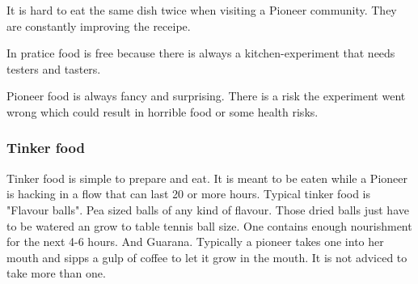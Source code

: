 It is hard to eat the same dish twice when visiting a Pioneer community. They are constantly improving the receipe.

In pratice food is free because there is always a kitchen-experiment that needs testers and tasters.

Pioneer food is always fancy and surprising. There is a risk the experiment went wrong which could result in horrible food or some health risks.

\subsubsection{Tinker food}

Tinker food is simple to prepare and eat. It is meant to be eaten while a Pioneer is hacking in a flow that can last 20 or more hours. Typical tinker food is "Flavour balls". Pea sized balls of any kind of flavour. Those dried balls just have to be watered an grow to table tennis ball size. One contains enough nourishment for the next 4-6 hours. And Guarana.
Typically a pioneer takes one into her mouth and sipps a gulp of coffee to let it grow in the mouth. It is not adviced to take more than one.

